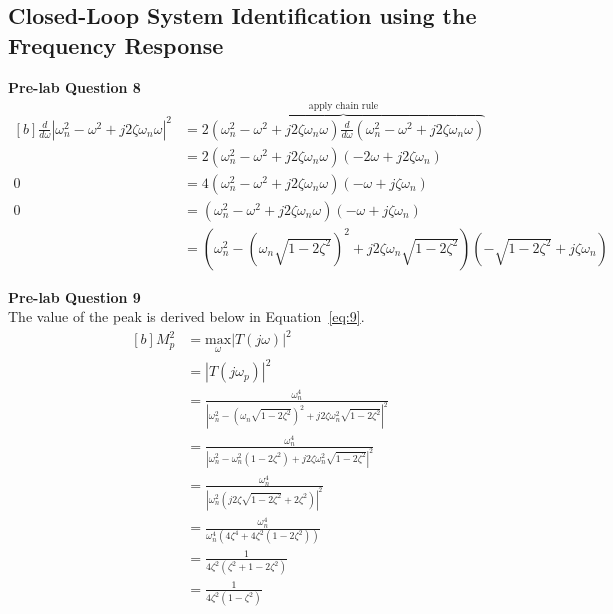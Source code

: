 \documentclass[12pt]{article}
\begin{document}
\subsection{Closed-Loop System Identification using the Frequency Response}
\textbf{Pre-lab Question 8} \\
\begin{equation}
\begin{aligned}[b]
    \frac{d}{d\omega} \left|\omega_n^2 - \omega^2 + j2\zeta\omega_n\omega\right|^2 &= \overbrace{2 (\omega_n^2 - \omega^2 + j2\zeta\omega_n\omega) \frac{d}{d\omega} (\omega_n^2 - \omega^2 + j2\zeta\omega_n\omega)}^{\text{apply chain rule}} \\
    &= 2 (\omega_n^2 - \omega^2 + j2\zeta\omega_n\omega) (-2\omega + j2\zeta\omega_n) \\
    0 &= 4 (\omega_n^2 - \omega^2 + j2\zeta\omega_n\omega) (-\omega + j\zeta\omega_n) \\
    0 &= (\omega_n^2 - \omega^2 + j2\zeta\omega_n\omega) (-\omega + j\zeta\omega_n) \\
    &= (\omega_n^2 - (\omega_n\sqrt{1-2\zeta^2})^2 + j2\zeta\omega_n\sqrt{1-2\zeta^2}) (-\sqrt{1-2\zeta^2} + j\zeta\omega_n)
\end{aligned}
\end{equation}

\textbf{Pre-lab Question 9} \\
The value of the peak is derived below in Equation~\ref{eq:9}.
\begin{equation} \label{eq:9}
\begin{aligned}[b]
    M_p^2 &= \underset{\omega}{\text{max}}\left| T(j\omega) \right|^2 \\
    &= \left| T(j\omega_p) \right|^2 \\
    &= \frac{\omega_n^4}{\left| \omega_n^2 - (\omega_n\sqrt{1-2\zeta^2})^2 + j2\zeta\omega_n^2\sqrt{1-2\zeta^2} \right|^2} \\
    &= \frac{\omega_n^4}{\left| \omega_n^2 - \omega_n^2(1-2\zeta^2) + j2\zeta\omega_n^2\sqrt{1-2\zeta^2} \right|^2} \\
    &= \frac{\omega_n^4}{\left| \omega_n^2 \left( j2\zeta\sqrt{1-2\zeta^2} + 2\zeta^2 \right) \right|^2} \\
    &= \frac{\omega_n^4}{\omega_n^4 (4\zeta^4 + 4\zeta^2 (1-2\zeta^2))} \\
    &= \frac{1}{4\zeta^2 (\zeta^2 + 1 - 2\zeta^2)} \\
    &= \frac{1}{4\zeta^2 (1 - \zeta^2)}
\end{aligned}
\end{equation}
\end{document}
